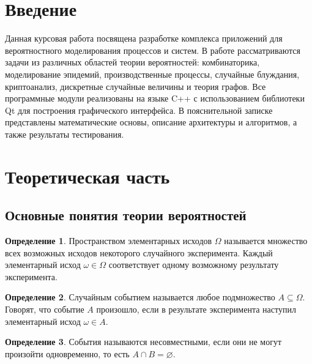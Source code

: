\documentclass[a4paper]{article}
\theoremstyle{definition}
\newtheorem{definition}{Определение}[subsection]
\begin{document}
\tableofcontents
\newpage

\section*{Введение}

Данная курсовая работа посвящена разработке комплекса приложений для вероятностного моделирования процессов и систем. В работе рассматриваются задачи из различных областей теории вероятностей: комбинаторика, моделирование эпидемий, производственные процессы, случайные блуждания, криптоанализ, дискретные случайные величины и теория графов. Все программные модули реализованы на языке C++ с использованием библиотеки Qt для построения графического интерфейса. В пояснительной записке представлены математические основы, описание архитектуры и алгоритмов, а также результаты тестирования.

\section{Теоретическая часть}

\subsection{Основные понятия теории вероятностей}

\begin{definition}
Пространством элементарных исходов $\Omega$ называется множество всех возможных исходов некоторого случайного эксперимента. Каждый элементарный исход $\omega \in \Omega$ соответствует одному возможному результату эксперимента.
\end{definition}

\begin{definition}
Случайным событием называется любое подмножество $A \subseteq \Omega$. Говорят, что событие $A$ произошло, если в результате эксперимента наступил элементарный исход $\omega \in A$.
\end{definition}

\begin{definition}
События называются несовместными, если они не могут произойти одновременно, то есть $A \cap B = \varnothing$.
\end{definition}
\end{document}

